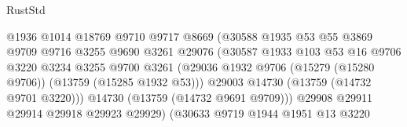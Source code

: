 \begin{lexlean}{RustStd}
\begin{coremodule}
                                          @1936
                                          @1014
                                          @18769
                                          @9710
                                          @9717
                                          @8669
                                          (@30588
                                            @1935
                                            @53
                                            @55
                                            @3869
                                            @9709
                                            @9716
                                            @3255
                                            @9690
                                            @3261
                                            @29076
                                            (@30587
                                              @1933
                                              @103
                                              @53
                                              @16
                                              @9706
                                              @3220
                                              @3234
                                              @3255
                                              @9700
                                              @3261
                                              (@29036
                                                @1932
                                                @9706
                                                (@15279 (@15280 @9706))
                                                (@13759 (@15285 @1932 @53)))
                                              @29003
                                              @14730
                                              (@13759 (@14732 @9701 @3220)))
                                            @14730
                                            (@13759 (@14732 @9691 @9709)))
                                          @29908
                                          @29911
                                          @29914
                                          @29918
                                          @29923
                                          @29929)
                                        (@30633
                                          @9719
                                          @1944
                                          @1951
                                          @13
                                          @3220

\end{coremodule}
\end{lexlean}

